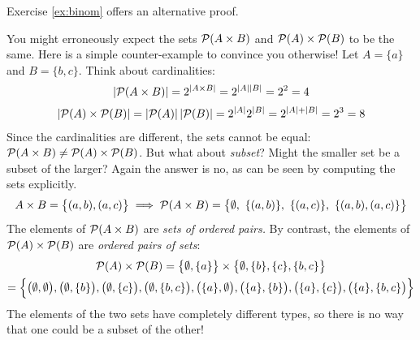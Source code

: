 Exercise \ref{ex:binom} offers an alternative proof.


\begin{example}{}{}
	You might erroneously expect the sets $\mathcal{P}(A\times B)$ and $\mathcal{P}(A)\times\mathcal{P}(B)$ to be the same. Here is a simple counter-example to convince you otherwise!\smallbreak
	Let $A=\{a\}$ and $B=\{b,c\}$. Think about cardinalities:
	\begin{gather*}
		\left| \mathcal{P}(A\times B)\right|=2^{\left| A\times B\right|}=2^{\left| A\right|\left| B\right|}=2^2=4\\[2pt]
		\left| \mathcal{P}(A)\times\mathcal{P}(B)\right| =\left| \mathcal{P}(A)\right|\left| \mathcal{P}(B)\right| =2^{\left| A\right|}2^{\left| B\right|}=2^{\left| A\right|+\left| B\right|}=2^3=8
	\end{gather*}
	Since the cardinalities are different, the sets cannot be equal: $\mathcal{P}(A\times B)\neq \mathcal{P}(A)\times\mathcal{P}(B)$. But what about \emph{subset}? Might the smaller set be a subset of the larger? Again the answer is no, as can be seen by computing the sets explicitly.
	\[
		A\times B=\bigl\{(a,b),(a,c)\bigr\} \implies \cP(A\times B)=\big\{\emptyset,\ \{(a,b)\},\ \{(a,c)\},\ \{(a,b),(a,c)\}\big\}
	\]
	The elements of $\mathcal{P}(A\times B)$ are \emph{sets of ordered pairs.} By contrast, the elements of $\mathcal{P}(A)\times\mathcal{P}(B)$ are \emph{ordered pairs of sets}:
	\begin{multline*}
		\mathcal{P}(A)\times\mathcal{P}(B) =\big\{\emptyset,\{a\}\big\}\times \big\{\emptyset,\{b\},\{c\},\{b,c\}\big\}\\*
		=\Bigl\{\bigl(\emptyset,\emptyset\bigr), \bigl(\emptyset,\{b\}\bigr), \bigl(\emptyset,\{c\}\bigr), \bigl(\emptyset,\{b,c\}\bigr), \bigl(\{a\},\emptyset\bigr), \bigl(\{a\},\{b\}\bigr), \bigl(\{a\},\{c\}\bigr), \bigl(\{a\},\{b,c\}\bigr)\Bigr\}
	\end{multline*}
	The elements of the two sets have completely different types, so there is no way that one could be a subset of the other!
\end{example}

\goodbreak




